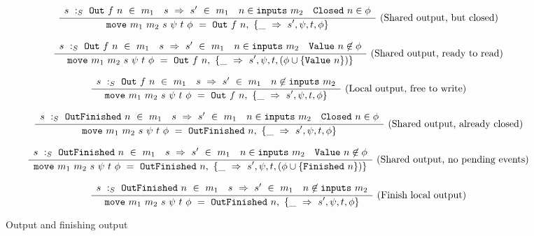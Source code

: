 \begin{figure*}


$$
\ruleI
{
    \arrLCCR
        { \CheckStateTypeM{m_1}{s}{\Out{f}{n}} }
        { \TransUM{s}{s'}{m_1} }
        { n \in \inputs{m_2} }
        { \Closed{n} \in \phi }
}
{
    \MoveOut
        {\sptp}
        {\Out{f}{n}}
        {\MoveTU{\sPptpC}}
}
\textrm{(Shared output, but closed)}
$$

$$
\ruleI
{
    \arrLCCR
        { \CheckStateTypeM{m_1}{s}{\Out{f}{n}} }
        { \TransUM{s}{s'}{m_1} }
        { n \in \inputs{m_2} }
        { \Value{n} \not\in \phi }
}
{
    \MoveOut
        {\sptp}
        {\Out{f}{n}}
        {\MoveTU{s', \psi, t, (\phi \cup \sgl{\Value{n}}) }}
}
\textrm{(Shared output, ready to read)}
$$

$$
\ruleI
{
    \arrLCR
        { \CheckStateTypeM{m_1}{s}{\Out{f}{n}} }
        { \TransUM{s}{s'}{m_1} }
        { n \not\in \inputs{m_2} }
}
{
    \MoveOut
        {\sptp}
        {\Out{f}{n}}
        {\MoveTU{\sPptpC}}
}
\textrm{(Local output, free to write)}
$$

$$
\ruleI
{
    \arrLCCR
        { \CheckStateTypeM{m_1}{s}{\OutFinished{n}} }
        { \TransUM{s}{s'}{m_1} }
        { n \in \inputs{m_2} }
        { \Closed{n} \in \phi }
}
{
    \MoveOut
        {\sptp}
        {\OutFinished{n}}
        {\MoveTU{\sPptpC}}
}
\textrm{(Shared output, already closed)}
$$

$$
\ruleI
{
    \arrLCCR
        { \CheckStateTypeM{m_1}{s}{\OutFinished{n}} }
        { \TransUM{s}{s'}{m_1} }
        { n \in \inputs{m_2} }
        { \Value{n} \not\in \phi }
}
{
    \MoveOut
        {\sptp}
        {\OutFinished{n}}
        {\MoveTU{s',\psi,t,(\phi \cup \sgl{\Finished{n}})}}
}
\textrm{(Shared output, no pending events)}
$$

$$
\ruleI
{
    \arrLCR
        { \CheckStateTypeM{m_1}{s}{\OutFinished{n}} }
        { \TransUM{s}{s'}{m_1} }
        { n \not\in \inputs{m_2} }
}
{
    \MoveOut
        {\sptp}
        {\OutFinished{n}}
        {\MoveTU{\sPptpC}}
}
\textrm{(Finish local output)}
$$

\caption{Output and finishing output}
\label{fig:merge:gen:out}
\end{figure*}

